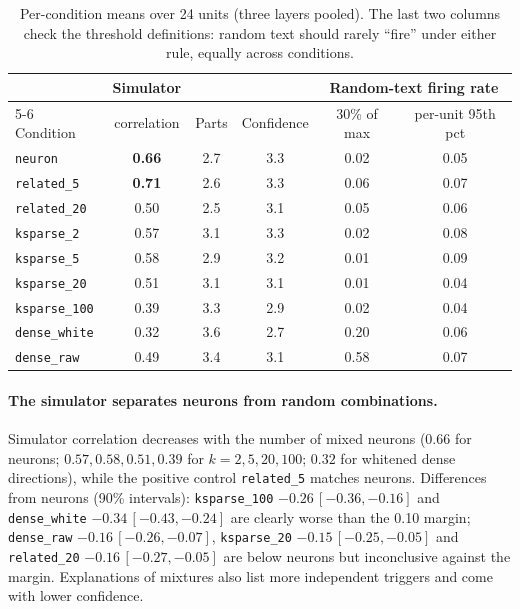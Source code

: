 \documentclass[11pt]{article}
\begin{document}
\begin{table}[h]
\centering\small
\begin{tabular}{lccccc}
\toprule
& Simulator & & & \multicolumn{2}{c}{Random-text firing rate} \\
\cmidrule(lr){5-6}
Condition & correlation & Parts & Confidence & 30\% of max & per-unit 95th pct \\
\midrule
\texttt{neuron}       & \textbf{0.66} & 2.7 & 3.3 & 0.02 & 0.05 \\
\texttt{related\_5}   & \textbf{0.71} & 2.6 & 3.3 & 0.06 & 0.07 \\
\texttt{related\_20}  & 0.50 & 2.5 & 3.1 & 0.05 & 0.06 \\
\texttt{ksparse\_2}   & 0.57 & 3.1 & 3.3 & 0.02 & 0.08 \\
\texttt{ksparse\_5}   & 0.58 & 2.9 & 3.2 & 0.01 & 0.09 \\
\texttt{ksparse\_20}  & 0.51 & 3.1 & 3.1 & 0.01 & 0.04 \\
\texttt{ksparse\_100} & 0.39 & 3.3 & 2.9 & 0.02 & 0.04 \\
\texttt{dense\_white} & 0.32 & 3.6 & 2.7 & 0.20 & 0.06 \\
\texttt{dense\_raw}   & 0.49 & 3.4 & 3.1 & 0.58 & 0.07 \\
\bottomrule
\end{tabular}
\caption{Per-condition means over 24 units (three layers pooled). The last two columns check the threshold
definitions: random text should rarely ``fire'' under either rule, equally across conditions.}
\label{tab:main}
\end{table}

\paragraph{The simulator separates neurons from random combinations.} Simulator correlation decreases with the number
of mixed neurons ($0.66$ for neurons; $0.57, 0.58, 0.51, 0.39$ for $k=2,5,20,100$; $0.32$ for whitened dense
directions), while the positive control \texttt{related\_5} matches neurons. Differences from neurons (90\% intervals):
\texttt{ksparse\_100} $-0.26\,[-0.36,-0.16]$ and \texttt{dense\_white} $-0.34\,[-0.43,-0.24]$ are clearly worse than
the 0.10 margin; \texttt{dense\_raw} $-0.16\,[-0.26,-0.07]$, \texttt{ksparse\_20} $-0.15\,[-0.25,-0.05]$ and
\texttt{related\_20} $-0.16\,[-0.27,-0.05]$ are below neurons but inconclusive against the margin. Explanations of
mixtures also list more independent triggers and come with lower confidence.
\end{document}

